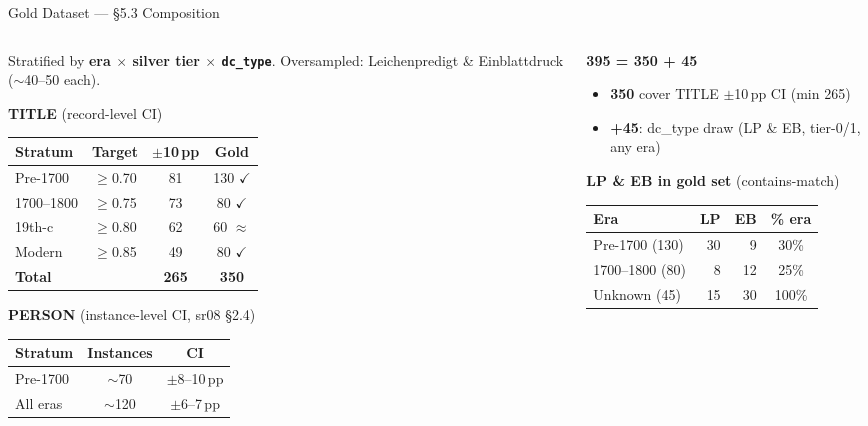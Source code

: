 \documentclass[xcolor,aspectratio=169,compress]{beamer}
\begin{document}
\begin{frame}{Gold Dataset --- \S5.3 Composition}
  \small
  \begin{columns}[t]
    \begin{column}{.55\textwidth}
      \footnotesize
      Stratified by \textbf{era $\times$ silver tier $\times$ \texttt{dc\_type}}.
      Oversampled: Leichenpredigt \& Einblattdruck ($\sim$40--50 each).

      \smallskip
      \textbf{TITLE} \textnormal{(record-level CI)}
      \begin{tabular}{lccc}
        \toprule
        Stratum & Target & $\pm$10\,pp & Gold \\
        \midrule
        Pre-1700    & $\geq$0.70 &  81 & 130 \textcolor{green!60!black}{$\checkmark$} \\
        1700--1800  & $\geq$0.75 &  73 &  80 \textcolor{green!60!black}{$\checkmark$} \\
        19th-c      & $\geq$0.80 &  62 &  60 \textcolor{green!60!black}{$\approx$} \\
        Modern      & $\geq$0.85 &  49 &  80 \textcolor{green!60!black}{$\checkmark$} \\
        \midrule
        \textbf{Total} & & \textbf{265} & \textbf{350} \\
        \bottomrule
      \end{tabular}

      \medskip
      \textbf{PERSON} \textnormal{(instance-level CI, sr08 §2.4)}
      \begin{tabular}{lcc}
        \toprule
        Stratum & Instances & CI \\
        \midrule
        Pre-1700 & $\sim$70 & $\pm$8--10\,pp \\
        All eras & $\sim$120 & $\pm$6--7\,pp \\
        \bottomrule
      \end{tabular}
    \end{column}
    \begin{column}{.42\textwidth}
      \textbf{395 = 350 + 45}
      \begin{itemize}\setlength{\itemsep}{2pt}
        \item \textbf{350} cover TITLE $\pm$10\,pp CI (min 265)
        \item \textbf{+45}: dc\_type draw (LP \& EB, tier-0/1, any era)
      \end{itemize}
      \smallskip

      \footnotesize\textbf{LP \& EB in gold set} \textnormal{(contains-match)}
      \begin{tabular}{lrrc}
        \toprule
        Era & LP & EB & \% era \\
        \midrule
        Pre-1700 (130)  & 30 &  9 & 30\% \\
        1700--1800 (80) &  8 & 12 & 25\% \\
        Unknown (45)    & 15 & 30 & 100\% \\
        \bottomrule
      \end{tabular}


\end{column}
\end{columns}
\end{frame}
\end{document}
